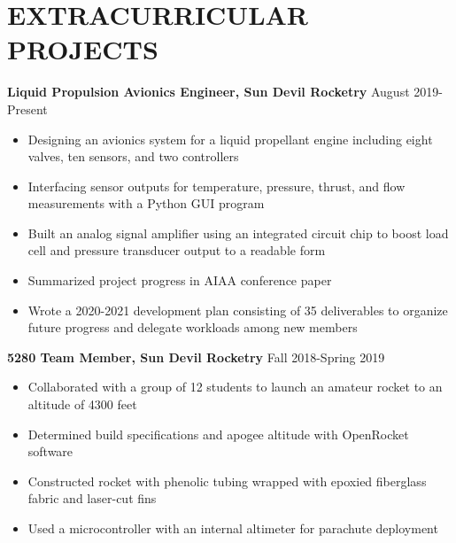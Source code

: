 \documentclass{article}
\begin{document}
\section{EXTRACURRICULAR PROJECTS}
\textbf{Liquid Propulsion Avionics Engineer, Sun Devil Rocketry}
\hfill
\vspace{0.5em}
August 2019-Present
\begin{itemize}
	\item{Designing an avionics system for a liquid propellant engine including eight valves, ten sensors, and two controllers}
	\item{Interfacing sensor outputs for temperature, pressure, thrust, and flow measurements with a Python GUI program}
	\item{Built an analog signal amplifier using an integrated circuit chip to boost load cell and pressure transducer output to a readable form}
	\item{Summarized project progress in AIAA conference paper}
	\item{Wrote a 2020-2021 development plan consisting of 35 deliverables to organize future progress and delegate workloads among new members}
\end{itemize}
\vspace{1em}
\textbf{5280 Team Member, Sun Devil Rocketry}
\hfill Fall 2018-Spring 2019
\vspace{0.5em}
\begin{itemize}
	\item Collaborated with a group of 12 students to launch an amateur rocket to an altitude of 4300 feet
	\item Determined build specifications and apogee altitude with OpenRocket software
	\item Constructed rocket with phenolic tubing wrapped with epoxied fiberglass fabric and laser-cut fins 
	\item Used a microcontroller with an internal altimeter for parachute deployment
\end{itemize}
\end{document}
